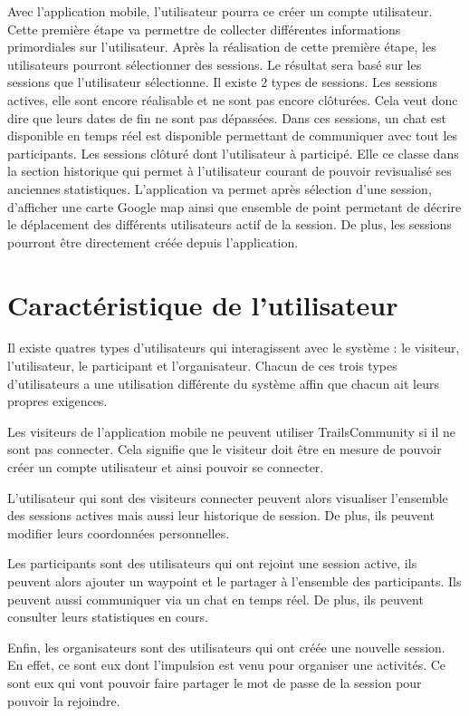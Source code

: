 \documentclass[titlepage, 12pt]{report}
\begin{document}
Avec l'application mobile, l'utilisateur pourra ce créer un compte utilisateur. Cette première étape va permettre de collecter différentes informations primordiales sur l'utilisateur. 
Après la réalisation de cette première étape, les utilisateurs pourront sélectionner des sessions. Le résultat sera basé sur les sessions que l'utilisateur sélectionne. Il existe 2 types de sessions. Les sessions actives, elle sont encore réalisable et ne sont pas encore clôturées. Cela veut donc dire que leurs dates de fin ne sont pas dépassées. Dans ces sessions, un chat est disponible en temps réel est disponible permettant de communiquer avec tout les participants.
Les sessions clôturé dont l'utilisateur à participé. Elle ce classe dans la section historique qui permet à l'utilisateur courant de pouvoir revisualisé ses anciennes statistiques.
L'application va permet après sélection d'une session, d'afficher une carte Google map ainsi que ensemble de point permetant de décrire le déplacement des différents utilisateurs actif de la session.
De plus, les sessions pourront être directement créée depuis l'application.

\section{Caractéristique de l'utilisateur}

Il existe quatres types d'utilisateurs qui interagissent avec le système : le visiteur, l'utilisateur, le participant et l'organisateur. Chacun de ces trois types d'utilisateurs a une utilisation différente du système affin que chacun ait leurs propres exigences.

Les visiteurs de l'application mobile ne peuvent utiliser TrailsCommunity si il ne sont pas connecter. Cela signifie que le visiteur doit être en mesure de pouvoir créer un compte utilisateur et ainsi pouvoir se connecter.

L'utilisateur qui sont des visiteurs connecter peuvent alors visualiser l'ensemble des sessions actives mais aussi leur historique de session.
De plus, ils peuvent modifier leurs coordonnées personnelles.

Les participants sont des utilisateurs qui ont rejoint une session active, ils peuvent alors ajouter un waypoint et le partager à l'ensemble des participants. Ils peuvent aussi communiquer via un chat en temps réel. De plus, ils peuvent consulter leurs statistiques en cours.

Enfin, les organisateurs sont des utilisateurs qui ont créée une nouvelle session. En effet, ce sont eux dont l'impulsion est venu pour organiser une activités. Ce sont eux qui vont pouvoir faire partager le mot de passe de la session pour pouvoir la rejoindre.
\end{document}
